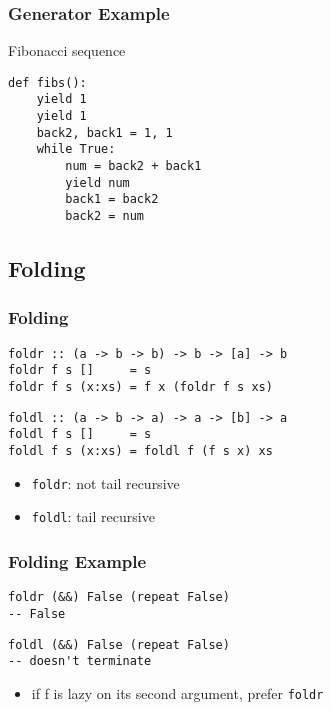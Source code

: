 \documentclass[dvipsnames]{beamer}
\theoremstyle{plain}
\begin{document}
\begin{frame}[fragile]
  \frametitle{Generator Example}

  \begin{exampleblock}{Fibonacci sequence}
    \begin{lstlisting}
def fibs():
    yield 1
    yield 1
    back2, back1 = 1, 1
    while True:
        num = back2 + back1
        yield num
        back1 = back2
        back2 = num
    \end{lstlisting}
  \end{exampleblock}
\end{frame}

\lstset{language=Haskell}

\subsection{Folding}

\begin{frame}[fragile]
  \frametitle{Folding}

  \begin{lstlisting}
foldr :: (a -> b -> b) -> b -> [a] -> b
foldr f s []     = s
foldr f s (x:xs) = f x (foldr f s xs)
    \end{lstlisting}

    \begin{lstlisting}
foldl :: (a -> b -> a) -> a -> [b] -> a
foldl f s []     = s
foldl f s (x:xs) = foldl f (f s x) xs
  \end{lstlisting}

  \medskip
  \begin{itemize}
    \item \lstinline|foldr|: not tail recursive
    \item \lstinline|foldl|: tail recursive
  \end{itemize}
\end{frame}

\begin{frame}[fragile]
  \frametitle{Folding Example}

  \begin{lstlisting}
foldr (&&) False (repeat False)
-- False
  \end{lstlisting}

  \pause
  \begin{lstlisting}
foldl (&&) False (repeat False)
-- doesn't terminate
  \end{lstlisting}

  \pause
  \medskip
  \begin{itemize}
    \item if f is lazy on its second argument, prefer \lstinline|foldr|
  \end{itemize}
\end{frame}
\end{document}
